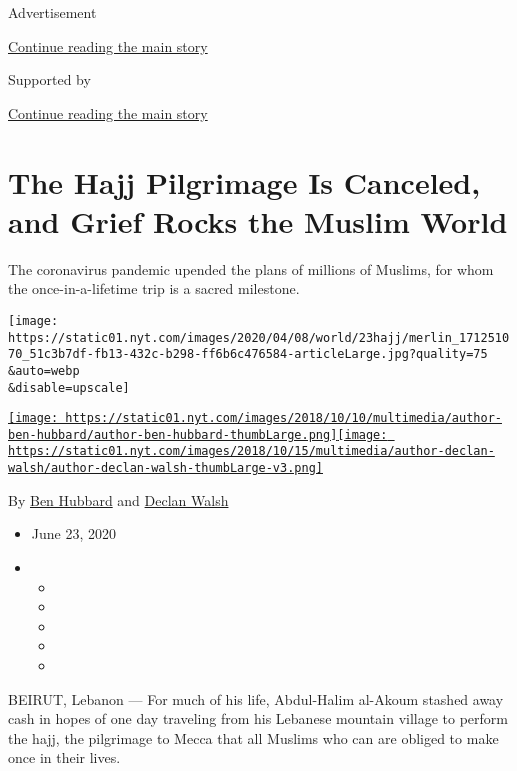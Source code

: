 Advertisement

\protect\hyperlink{after-top}{Continue reading the main story}

Supported by

\protect\hyperlink{after-sponsor}{Continue reading the main story}

\hypertarget{the-hajj-pilgrimage-is-canceled-and-grief-rocks-the-muslim-world}{%
\section{The Hajj Pilgrimage Is Canceled, and Grief Rocks the Muslim
World}\label{the-hajj-pilgrimage-is-canceled-and-grief-rocks-the-muslim-world}}

The coronavirus pandemic upended the plans of millions of Muslims, for
whom the once-in-a-lifetime trip is a sacred milestone.

\texttt{[image: https://static01.nyt.com/images/2020/04/08/world/23hajj/merlin\_171251070\_51c3b7df-fb13-432c-b298-ff6b6c476584-articleLarge.jpg?quality=75\\\&auto=webp\\\&disable=upscale]}

\href{https://www.nytimes.com/by/ben-hubbard}{\texttt{[image: https://static01.nyt.com/images/2018/10/10/multimedia/author-ben-hubbard/author-ben-hubbard-thumbLarge.png]}}\href{https://www.nytimes.com/by/declan-walsh}{\texttt{[image: https://static01.nyt.com/images/2018/10/15/multimedia/author-declan-walsh/author-declan-walsh-thumbLarge-v3.png]}}

By \href{https://www.nytimes.com/by/ben-hubbard}{Ben Hubbard} and
\href{https://www.nytimes.com/by/declan-walsh}{Declan Walsh}

\begin{itemize}
\item
  June 23, 2020
\item
  \begin{itemize}
  \item
  \item
  \item
  \item
  \item
  \end{itemize}
\end{itemize}

BEIRUT, Lebanon --- For much of his life, Abdul-Halim al-Akoum stashed
away cash in hopes of one day traveling from his Lebanese mountain
village to perform the hajj, the pilgrimage to Mecca that all Muslims
who can are obliged to make once in their lives.


